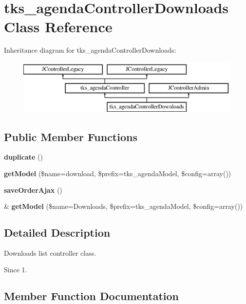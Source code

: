 \section{tks\+\_\+agenda\+Controller\+Downloads Class Reference}
\label{classtks__agenda_controller_downloads}
Inheritance diagram for tks\+\_\+agenda\+Controller\+Downloads\+:\begin{figure}[H]
\begin{center}
\leavevmode
\includegraphics[height=2.772277cm]{classtks__agenda_controller_downloads}
\end{center}
\end{figure}
\subsection*{Public Member Functions}
\begin{DoxyCompactItemize}
\item 
\textbf{ duplicate} ()
\item 
\textbf{ get\+Model} (\$name=\textquotesingle{}download\textquotesingle{}, \$prefix=\textquotesingle{}tks\+\_\+agenda\+Model\textquotesingle{}, \$config=array())
\item 
\textbf{ save\+Order\+Ajax} ()
\item 
\& \textbf{ get\+Model} (\$name=\textquotesingle{}Downloads\textquotesingle{}, \$prefix=\textquotesingle{}tks\+\_\+agenda\+Model\textquotesingle{}, \$config=array())
\end{DoxyCompactItemize}


\subsection{Detailed Description}
Downloads list controller class.

\begin{DoxySince}{Since}
1. 
\end{DoxySince}


\subsection{Member Function Documentation}
\mbox{\label{classtks__agenda_controller_downloads_a982be2ab3c656d4d6aec2c29e3eba956}} 
